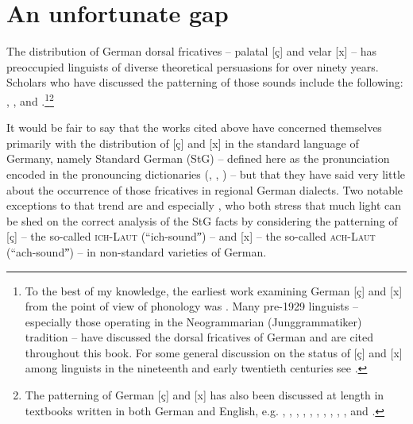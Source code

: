 \section{{An} {unfortunate} {gap}}\label{sec:1.1}
The distribution of German dorsal fricatives -- palatal [ç] and velar [x] -- has preoccupied linguists of diverse theoretical persuasions for over ninety years. Scholars who have discussed the patterning of those sounds include the following: \citet{Jones1929, Hermann1932, Bloomfield1933,Trubetzkoy1939, Moulton1947, Leopold1948, Jones1950,  Trim1951, Dietrich1953, Trost1958, Heike1961, Freudenberg1966,  Pilch1966, Adamus1967,  Vennemann1968, James1969, Ungeheuer1969, Bluhme1970, Wiesemann1970, Wurzel1970,  Kufner1971, ZacherGriščenko1971, Werner1972, Scholz1972, Werner1973, Issatschenko1973, Standwell1973, Philipp1974, Dressler1977, Griffin1977, Kohler1977b, Russ1978Development, Cercignani1979, Wurzel1980, Russ1982, vanLessenKloeke1982,vanLessenKloeke1982b, MeinholdStock1982, Vennemann1982,  Cercignani1983, Wurzel1983, Lenerz1985,  Benware1986, Lieber1987, Jessen1988, Ronneberger-Sibold1988, Hall1989, MacfarlandPierrehumbert1991, Hall1992, Yu1992, IversonSalmons1992, Borowsky1993, vandeWeijer1994, Wiese1996a,Merchant1996,Noske1997, Grijzenhout1998, Scheer2004, Fox2005, Halle2005, Glover2014}, \citet{Hall2020}, and \citet{Kijak2021}.\footnote{To the best of my knowledge, the earliest work examining German [ç] and [x] from the point of view of phonology was \citet{Jones1929}. Many pre-1929 linguists -- especially those operating in the Neogrammarian (Junggrammatiker) tradition -- have discussed the dorsal fricatives of German and are cited throughout this book. For some general discussion on the status of [ç] and [x] among linguists in the nineteenth and early twentieth centuries see .}\footnote{The patterning of German [ç] and [x] has also been discussed at length in textbooks written in both German and English, e.g.  \citet[9--10]{Hyman1975}, \citet[36--37; 96]{Lass1984}, \citet[75--80; 104--106]{Ternes1987}, \citet[98--101]{RamersVater1991}, \citet[308--309]{Kenstowicz1994}, \citet[7--8; 31]{CowanRakušan1998}, \citet[62--64]{Hall2000}, \citet[62--70]{Féry2001}, \citet[59--63]{Gussmann2002}, \citet[25--28]{Fagan2009}, and \citet[115--117]{O-BrienFagan2016}.}

It would be fair to say that the works cited above have concerned themselves primarily with the distribution of [ç] and [x] in the standard language of Germany, namely Standard German (StG) -- defined here as the pronunciation encoded in the pronouncing dictionaries (\citealt{Siebs1969}, \citealt{Krech1982}, \citealt{Mangold2005}) -- but that they have said very little about the occurrence of those fricatives in regional German dialects. Two notable exceptions to that trend are \citet{Herrgen1986} and especially \citet{Robinson2001}, who both stress that much light can be shed on the correct analysis of the StG facts by considering the patterning of [ç] -- the so-called \textsc{ich-Laut} (“ich-soundˮ) -- and [x]  -- the so-called \textsc{ach-Laut} (“ach-soundˮ) -- in non-standard varieties of German. 

